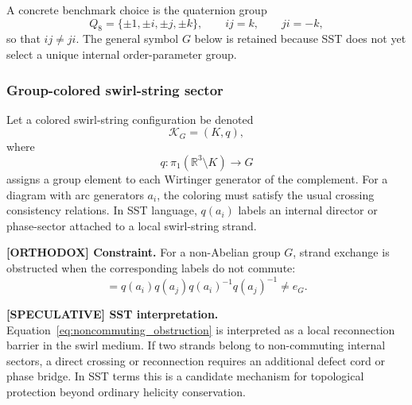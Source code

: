 A concrete benchmark choice is the quaternion group
\begin{equation}
    Q_8=\{\pm 1,\pm i,\pm j,\pm k\},
    \qquad ij=k,
    \qquad ji=-k,
\end{equation}
so that $ij\neq ji$.  The general symbol $G$ below is retained because SST does not yet select a unique internal order-parameter group.

\subsubsection{Group-colored swirl-string sector}
Let a colored swirl-string configuration be denoted
\begin{equation}
    \mathcal K_G=(K,q),
\end{equation}
where
\begin{equation}
    q: \pi_1\!\left(\mathbb R^3\setminus K\right)\longrightarrow G
    \label{eq:coloring_homomorphism}
\end{equation}
assigns a group element to each Wirtinger generator of the complement. For a diagram with arc generators $a_i$, the coloring must satisfy the usual crossing consistency relations. In SST language, $q(a_i)$ labels an internal director or phase-sector attached to a local swirl-string strand.

\textbf{[ORTHODOX] Constraint.}
For a non-Abelian group $G$, strand exchange is obstructed when the corresponding labels do not commute:
\begin{equation}
    [q(a_i),q(a_j)]
    = q(a_i)q(a_j)q(a_i)^{-1}q(a_j)^{-1}
    \neq e_G.
    \label{eq:noncommuting_obstruction}
\end{equation}

\textbf{[SPECULATIVE] SST interpretation.}
Equation~\eqref{eq:noncommuting_obstruction} is interpreted as a local reconnection barrier in the swirl medium. If two strands belong to non-commuting internal sectors, a direct crossing or reconnection requires an additional defect cord or phase bridge. In SST terms this is a candidate mechanism for topological protection beyond ordinary helicity conservation.

